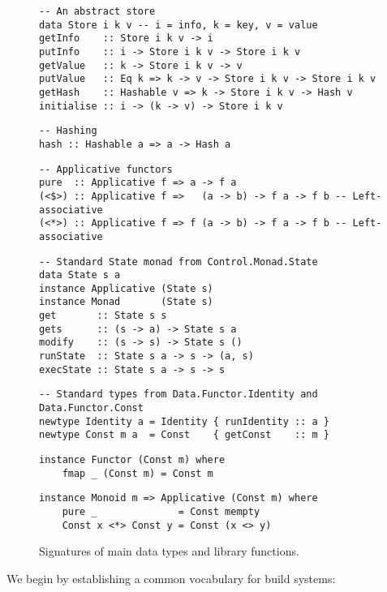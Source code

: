 \begin{figure}
\begin{verbatim}
-- An abstract store
data Store i k v -- i = info, k = key, v = value
getInfo    :: Store i k v -> i
putInfo    :: i -> Store i k v -> Store i k v
getValue   :: k -> Store i k v -> v
putValue   :: Eq k => k -> v -> Store i k v -> Store i k v
getHash    :: Hashable v => k -> Store i k v -> Hash v
initialise :: i -> (k -> v) -> Store i k v
\end{verbatim}
\vspace{1mm}
\begin{verbatim}
-- Hashing
hash :: Hashable a => a -> Hash a
\end{verbatim}
\vspace{1mm}
\begin{verbatim}
-- Applicative functors
pure  :: Applicative f => a -> f a
(<$>) :: Applicative f =>   (a -> b) -> f a -> f b -- Left-associative
(<*>) :: Applicative f => f (a -> b) -> f a -> f b -- Left-associative
\end{verbatim}
\vspace{1mm}
\begin{verbatim}
-- Standard State monad from Control.Monad.State
data State s a
instance Applicative (State s)
instance Monad       (State s)
get       :: State s s
gets      :: (s -> a) -> State s a
modify    :: (s -> s) -> State s ()
runState  :: State s a -> s -> (a, s)
execState :: State s a -> s -> s
\end{verbatim}
\vspace{1mm}
\begin{verbatim}
-- Standard types from Data.Functor.Identity and Data.Functor.Const
newtype Identity a = Identity { runIdentity :: a }
newtype Const m a  = Const    { getConst    :: m }
\end{verbatim}
\vspace{0.5mm}
\begin{verbatim}
instance Functor (Const m) where
    fmap _ (Const m) = Const m
\end{verbatim}
\vspace{0.5mm}
\begin{verbatim}
instance Monoid m => Applicative (Const m) where
    pure _              = Const mempty
    Const x <*> Const y = Const (x <> y)
\end{verbatim}
\vspace{-3mm}
\caption{Signatures of main data types and library functions.}\label{fig-types}
\vspace{-4mm}
\end{figure}
We begin by establishing a common vocabulary for build systems:

